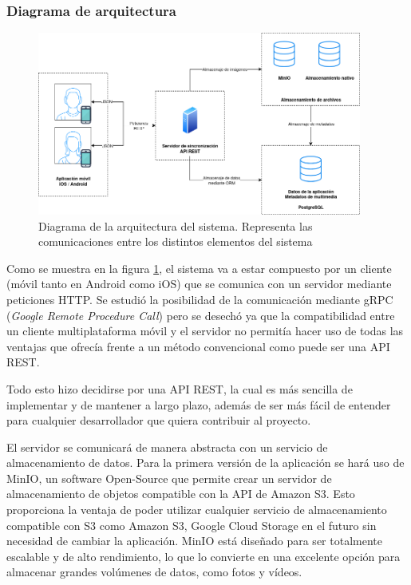 \subsubsection{Diagrama de arquitectura}
\begin{figure}[H]
    \begin{center}
        \includegraphics[width=0.95\textwidth]{images/diagrama-arquitectura.png}
    \end{center}
    \caption{Diagrama de la arquitectura del sistema. Representa las comunicaciones entre los distintos elementos del sistema}\label{fig:diagrama-arquitectura}
\end{figure}

Como se muestra en la figura \ref{fig:diagrama-arquitectura}, el sistema va a estar compuesto por un cliente (móvil tanto en Android como iOS) que se comunica con un servidor mediante peticiones HTTP.
Se estudió la posibilidad de la comunicación mediante gRPC (\textit{Google Remote Procedure Call}) pero se desechó ya que la compatibilidad entre un cliente multiplataforma móvil y el servidor no permitía hacer uso de todas las ventajas que ofrecía frente a un método convencional como puede ser una API REST.

Todo esto hizo decidirse por una API REST, la cual es más sencilla de implementar y de mantener a largo plazo, además de ser más fácil de entender para cualquier desarrollador que quiera contribuir al proyecto.

El servidor se comunicará de manera abstracta con un servicio de almacenamiento de datos. Para la primera versión de la aplicación se hará uso de MinIO, un software Open-Source que permite crear un servidor de almacenamiento de objetos compatible con la API de Amazon S3.
Esto proporciona la ventaja de poder utilizar cualquier servicio de almacenamiento compatible con S3 como Amazon S3, Google Cloud Storage en el futuro sin necesidad de cambiar la aplicación.
MinIO está diseñado para ser totalmente escalable y de alto rendimiento, lo que lo convierte en una excelente opción para almacenar grandes volúmenes de datos, como fotos y vídeos.

